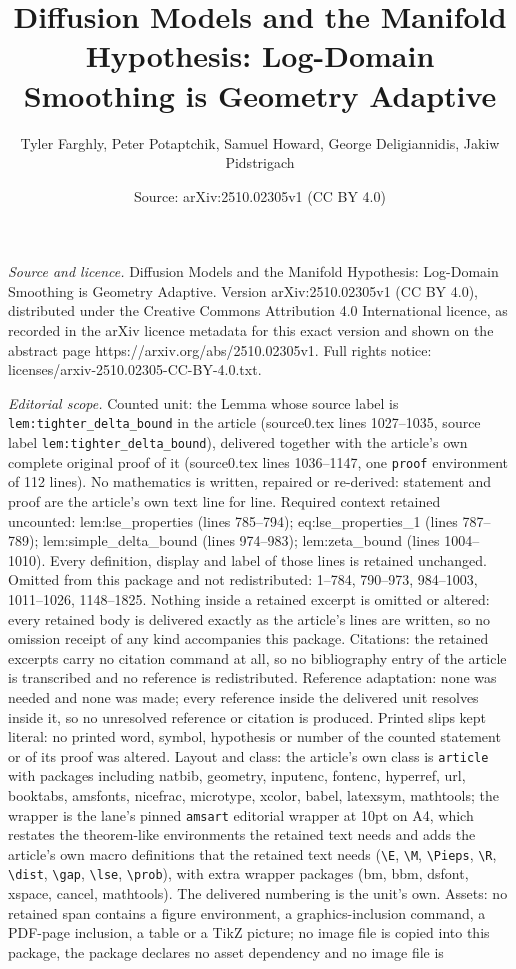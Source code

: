 \documentclass[10pt,a4paper]{amsart}
\title[Diffusion Models and the Manifold Hypothesis: Log-Domain Smo]{Diffusion Models and the Manifold Hypothesis: Log-Domain Smoothing is Geometry Adaptive}
\author{Tyler Farghly, Peter Potaptchik, Samuel Howard, George Deligiannidis, Jakiw Pidstrigach}
\date{Source: arXiv:2510.02305v1 (CC BY 4.0)}
\begin{document}
\maketitle

\noindent\emph{Source and licence.} Diffusion Models and the Manifold Hypothesis: Log-Domain Smoothing is Geometry Adaptive. Version arXiv:2510.02305v1 (CC BY 4.0), distributed under the Creative Commons Attribution 4.0 International licence, as recorded in the arXiv licence metadata for this exact version and shown on the abstract page https://arxiv.org/abs/2510.02305v1. Full rights notice: licenses/arxiv-2510.02305-CC-BY-4.0.txt.\par\smallskip

\noindent\textit{Editorial scope.} Counted unit: the Lemma whose source label is \texttt{lem:tighter\_delta\_bound} in the article (source0.tex lines 1027--1035, source label \texttt{lem:tighter\_delta\_bound}), delivered together with the article's own complete original proof of it (source0.tex lines 1036--1147, one \texttt{proof} environment of 112 lines). No mathematics is written, repaired or re-derived: statement and proof are the article's own text line for line. Required context retained uncounted: lem:lse\_properties (lines 785--794); eq:lse\_properties\_1 (lines 787--789); lem:simple\_delta\_bound (lines 974--983); lem:zeta\_bound (lines 1004--1010). Every definition, display and label of those lines is retained unchanged. Omitted from this package and not redistributed: 1--784, 790--973, 984--1003, 1011--1026, 1148--1825. Nothing inside a retained excerpt is omitted or altered: every retained body is delivered exactly as the article's lines are written, so no omission receipt of any kind accompanies this package. Citations: the retained excerpts carry no citation command at all, so no bibliography entry of the article is transcribed and no reference is redistributed. Reference adaptation: none was needed and none was made; every reference inside the delivered unit resolves inside it, so no unresolved reference or citation is produced. Printed slips kept literal: no printed word, symbol, hypothesis or number of the counted statement or of its proof was altered. Layout and class: the article's own class is \texttt{article} with packages including natbib, geometry, inputenc, fontenc, hyperref, url, booktabs, amsfonts, nicefrac, microtype, xcolor, babel, latexsym, mathtools; the wrapper is the lane's pinned \texttt{amsart} editorial wrapper at 10pt on A4, which restates the theorem-like environments the retained text needs and adds the article's own macro definitions that the retained text needs (\texttt{\textbackslash E}, \texttt{\textbackslash M}, \texttt{\textbackslash Pieps}, \texttt{\textbackslash R}, \texttt{\textbackslash dist}, \texttt{\textbackslash gap}, \texttt{\textbackslash lse}, \texttt{\textbackslash prob}), with extra wrapper packages (bm, bbm, dsfont, xspace, cancel, mathtools). The delivered numbering is the unit's own. Assets: no retained span contains a figure environment, a graphics-inclusion command, a PDF-page inclusion, a table or a TikZ picture; no image file is copied into this package, the package declares no asset dependency and no image file is 
\end{document}
